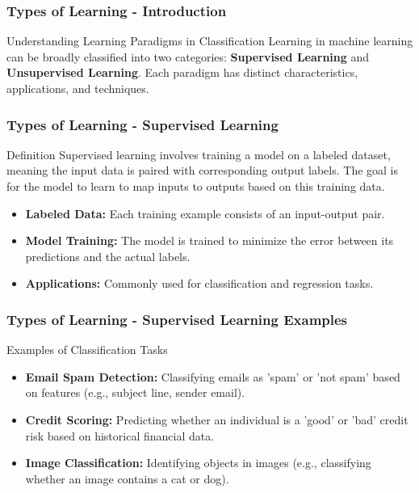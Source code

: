 \documentclass[aspectratio=169]{beamer}
\begin{document}
\begin{frame}[fragile]
    \frametitle{Types of Learning - Introduction}
    \begin{block}{Understanding Learning Paradigms in Classification}
        Learning in machine learning can be broadly classified into two categories: 
        \textbf{Supervised Learning} and \textbf{Unsupervised Learning}. Each paradigm has distinct characteristics, applications, and techniques.
    \end{block}
\end{frame}

\begin{frame}[fragile]
    \frametitle{Types of Learning - Supervised Learning}
    \begin{block}{Definition}
        Supervised learning involves training a model on a labeled dataset, meaning the input data is paired with corresponding output labels. The goal is for the model to learn to map inputs to outputs based on this training data.
    \end{block}
    \begin{itemize}
        \item \textbf{Labeled Data:} Each training example consists of an input-output pair.
        \item \textbf{Model Training:} The model is trained to minimize the error between its predictions and the actual labels.
        \item \textbf{Applications:} Commonly used for classification and regression tasks.
    \end{itemize}
\end{frame}

\begin{frame}[fragile]
    \frametitle{Types of Learning - Supervised Learning Examples}
    \begin{block}{Examples of Classification Tasks}
        \begin{itemize}
            \item \textbf{Email Spam Detection:} Classifying emails as 'spam' or 'not spam' based on features (e.g., subject line, sender email).
            \item \textbf{Credit Scoring:} Predicting whether an individual is a 'good' or 'bad' credit risk based on historical financial data.
            \item \textbf{Image Classification:} Identifying objects in images (e.g., classifying whether an image contains a cat or dog).
        \end{itemize}
    \end{block}
\end{frame}
\end{document}

